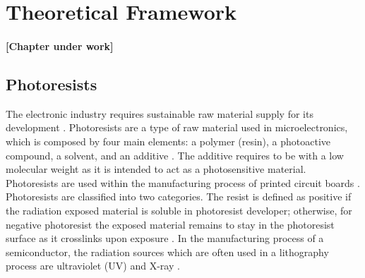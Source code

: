 
\chapter{Theoretical Framework} %

\label{Chapter:TheoreticalFramework}

\subsubsection*{\color{mygray}[Chapter under work]}

\section{Photoresists}
The electronic industry requires sustainable raw material supply for its development \cite{Sutikno2016}. Photoresists are a type of raw material used in microelectronics, which is composed by four main elements: a polymer (resin), a photoactive compound, a solvent, and an additive \cite{Schuster2009}. The additive requires to be with a low molecular weight as it is intended to act as a photosensitive material. Photoresists are used within the manufacturing process of printed circuit boards \cite{Staab2011}. Photoresists are classified into two categories. The resist is defined as positive if the radiation exposed material is soluble in photoresist developer; otherwise, for negative photoresist the exposed material remains to stay in the photoresist surface as it crosslinks upon exposure \cite{Landis2011,Sharma2012}. In the manufacturing process of a semiconductor, the radiation sources which are often used in a lithography process are ultraviolet (UV) and X-ray \cite{Mekaru2015}.


